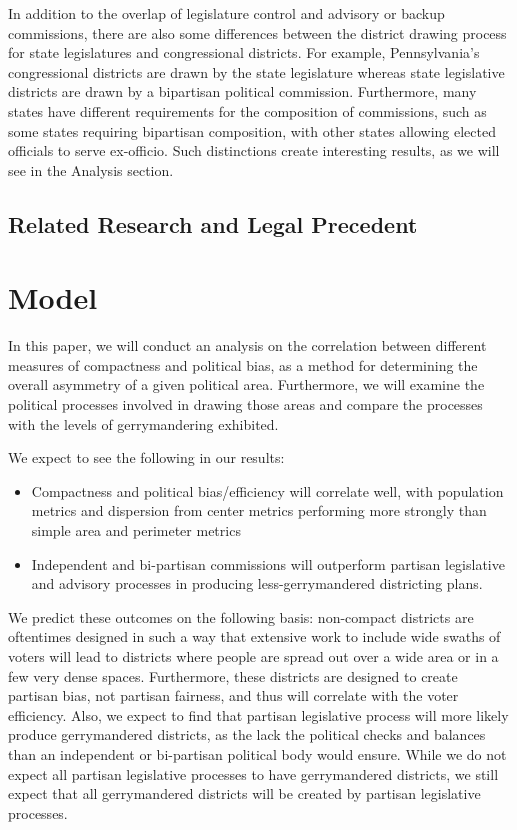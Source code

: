 \documentclass[12pt]{article}
\begin{document}
In addition to the overlap of legislature control and advisory or backup commissions, there are also some differences between the district drawing process for state legislatures and congressional districts.  For example, Pennsylvania's congressional districts are drawn by the state legislature whereas state legislative districts are drawn by a bipartisan political commission.  Furthermore, many states have different requirements for the composition of commissions, such as some states requiring bipartisan composition, with other states allowing elected officials to serve ex-officio.  Such distinctions create interesting results, as we will see in the Analysis section.

\subsection{Related Research and Legal Precedent}

  \section{Model}
  In this paper, we will conduct an analysis on the correlation between different measures of compactness and political bias, as a method for determining the overall asymmetry of a given political area.  Furthermore, we will examine the political processes involved in drawing those areas and compare the processes with the levels of gerrymandering exhibited.

  We expect to see the following in our results:
  \begin{itemize}
  \item Compactness and political bias/efficiency will correlate well, with population metrics and dispersion from center metrics performing more strongly than simple area and perimeter metrics
  \item Independent and bi-partisan commissions will outperform partisan legislative and advisory processes in producing less-gerrymandered districting plans.
  \end{itemize}

  We predict these outcomes on the following basis: non-compact districts are oftentimes designed in such a way that extensive work to include wide swaths of voters will lead to districts where people are spread out over a wide area or in a few very dense spaces.  Furthermore, these districts are designed to create partisan bias, not partisan fairness, and thus will correlate with the voter efficiency.  Also, we expect to find that partisan legislative process will more likely produce gerrymandered districts, as the lack the political checks and balances than an independent or bi-partisan political body would ensure.  While we do not expect all partisan legislative processes to have gerrymandered districts, we still expect that all gerrymandered districts will be created by partisan legislative processes.
\end{document}
